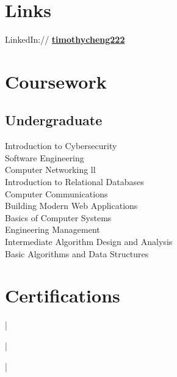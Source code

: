 \documentclass[]{deedy-resume-openfont}
\begin{document}
\begin{minipage}[t]{0.30\textwidth}

\section{Links}
LinkedIn://  \href{https://www.linkedin.com/in/timothycheng222/}{\bf timothycheng222} \\

\section{Coursework}

\subsection{Undergraduate}
Introduction to Cybersecurity \\
Software Engineering \\
Computer Networking ll \\
Introduction to Relational Databases \\
Computer Communications \\
Building Modern Web Applications \\
Basics of Computer Systems \\
Engineering Management \\
Intermediate Algorithm Design and Analysis \\
Basic Algorithms and Data Structures


\section{Certifications}
\href{https://www.credly.com/badges/31410198-3cd9-41b5-8a41-ef23b5e016b3}{} | 


\href{https://www.credly.com/earner/earned/badge/6ab55f9c-1900-4a88-a78f-9402f830ab07}{} | 

\href{https://www.credly.com/badges/1cc9f0d7-2ca2-475e-a5d6-485dc3b4123e}{} | 

%
%

\end{minipage} 
\end{document}
